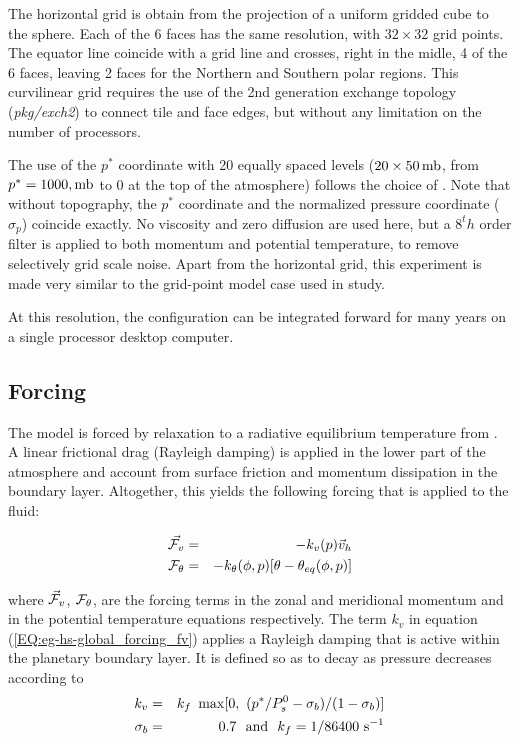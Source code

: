 The horizontal grid is obtain from the projection of a uniform gridded cube 
to the sphere. Each of the 6 faces has the same resolution, with 
$32 \times 32$ grid points. The equator line coincide with a grid line
and crosses, right in the midle, 4 of the 6 faces, leaving 2 faces 
for the Northern and Southern polar regions.
This curvilinear grid requires the use of the 2nd generation exchange
topology ({\it pkg/exch2}) to connect tile and face edges,
but without any limitation on the number of processors.

The use of the $p^*$ coordinate with 20 equally spaced levels
($20 \times 50\,{\rm mb}$, from $p^*=1000,{\rm mb}$ to $0$ at the 
top of the atmosphere) follows the choice of \cite{held-suar:94}. 
Note that without topography, the $p^*$ coordinate and the normalized 
pressure coordinate ($\sigma_p$) coincide exactly.
No viscosity and zero diffusion are used here, but
a $8^th$ order \cite{Shapiro_70} filter is applied to both momentum and
potential temperature, to remove selectively grid scale noise.
Apart from the horizontal grid, this experiment is made very similar to
the grid-point model case used in \cite{held-suar:94} study.

At this resolution, the configuration can be integrated forward 
for many years on a single processor desktop computer.
\\

\subsection{Forcing}
\label{www:tutorials}

The model is forced by relaxation to a radiative equilibrium temperature from
\cite{held-suar:94}.
A linear frictional drag (Rayleigh damping) is applied in the lower 
part of the atmosphere and account from surface friction and momentum
dissipation in the boundary layer.
Altogether, this yields the following forcing 
\cite[from][]{held-suar:94} that is applied to the fluid:

\begin{eqnarray}
\label{EQ:eg-hs-global_forcing}
\label{EQ:eg-hs-global_forcing_fv}
\vec{{\cal F}_v} & = & -k_v(p)\vec{v}_h
\\
\label{EQ:eg-hs-global_forcing_ft}
{\cal F}_{\theta} & = & -k_{\theta}(\phi,p)[\theta-\theta_{eq}(\phi,p)]
\end{eqnarray}

\noindent where ${\vec{\cal F}_{v}}$, ${\cal F}_{\theta}$,
are the forcing terms in the zonal and meridional
momentum and in the potential temperature equations respectively.
The term $k_{v}$ in equation (\ref{EQ:eg-hs-global_forcing_fv}) applies a
Rayleigh damping that is active within the planetary boundary layer. 
It is defined so as to decay as pressure decreases according to
\begin{eqnarray*}
\label{EQ:eg-hs-define_kv}
k_{v} & = & k_{f}~\max[0,~(p^*/P^{0}_{s}-\sigma_{b})/(1-\sigma_{b})]
\\
\sigma_{b} & = & 0.7 ~~{\rm and}~~
k_{f}  =  1/86400 ~{\rm s}^{-1}
\end{eqnarray*}

